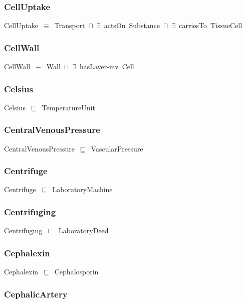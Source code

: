 \documentclass{article}
\begin{document}
\subsubsection*{CellUptake}

CellUptake~\ensuremath{\equiv}~Transport~\ensuremath{\sqcap}~\ensuremath{\exists}~actsOn~Substance~\ensuremath{\sqcap}~\ensuremath{\exists}~carriesTo~TissueCell

\subsubsection*{CellWall}

CellWall~\ensuremath{\equiv}~Wall~\ensuremath{\sqcap}~\ensuremath{\exists}~hasLayer-inv~Cell

\subsubsection*{Celsius}

Celsius~\ensuremath{\sqsubseteq}~TemperatureUnit~

\subsubsection*{CentralVenousPressure}

CentralVenousPressure~\ensuremath{\sqsubseteq}~VascularPressure~

\subsubsection*{Centrifuge}

Centrifuge~\ensuremath{\sqsubseteq}~LaboratoryMachine~

\subsubsection*{Centrifuging}

Centrifuging~\ensuremath{\sqsubseteq}~LaboratoryDeed~

\subsubsection*{Cephalexin}

Cephalexin~\ensuremath{\sqsubseteq}~Cephalosporin~

\subsubsection*{CephalicArtery}
\end{document}

